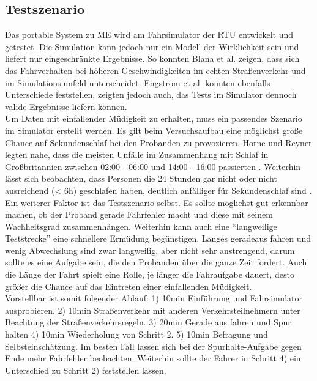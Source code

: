 {\subsection{Testszenario}
\label{sec:scene}
Das portable System zu \acl{ME} wird am Fahrsimulator der \acl{RTU} entwickelt und getestet.
Die Simulation kann jedoch nur ein Modell der Wirklichkeit sein und liefert nur eingeschränkte Ergebnisse. So konnten Blana et al. \cite{Blana_1} zeigen, dass sich das Fahrverhalten bei höheren Geschwindigkeiten im echten Straßenverkehr und im Simulationsumfeld unterscheidet. Engstrom et al.  \cite{Engstrom_2322937} konnten ebenfalls Unterschiede feststellen, zeigten jedoch auch, das Tests im Simulator dennoch valide Ergebnisse liefern können. \\

Um Daten mit einfallender Müdigkeit zu erhalten, muss ein passendes Szenario im Simulator erstellt werden. Es gilt beim Versuchsaufbau eine möglichst große Chance auf Sekundenschlaf bei den Probanden zu provozieren. Horne und Reyner legten nahe, dass die meisten Unfälle im Zusammenhang mit Schlaf in Großbritannien zwischen 02:00 - 06:00 und 14:00 - 16:00 passierten \cite{Horne_1757738}. Weiterhin lässt sich beobachten, dass Personen die 24 Stunden gar nicht oder nicht ausreichend (< 6h) geschlafen haben, deutlich anfälliger für Sekundenschlaf sind \cite{Peters_1}. 
Ein weiterer Faktor ist das Testszenario selbst. Es sollte möglichst gut erkennbar machen, ob der Proband gerade Fahrfehler macht und diese mit seinem Wachheitsgrad zusammenhängen. Weiterhin kann auch eine "`langweilige Teststrecke"' eine schnellere Ermüdung begünstigen. Langes geradeaus fahren und wenig Abwechslung sind zwar langweilig, aber nicht sehr anstrengend, darum sollte es eine Aufgabe sein, die den Probanden über die ganze Zeit fordert. Auch die Länge der Fahrt spielt eine Rolle, je länger die Fahraufgabe dauert, desto größer die Chance auf das Eintreten einer einfallenden Müdigkeit. \\

Vorstellbar ist somit folgender Ablauf: 1) 10min Einführung und Fahrsimulator ausprobieren. 2) 10min Straßenverkehr mit anderen Verkehrsteilnehmern unter Beachtung der Straßenverkehrsregeln. 3) 20min Gerade aus fahren und Spur halten 4) 10min Wiederholung von Schritt 2. 5) 10min Befragung und Selbsteinschätzung.
Im besten Fall lassen sich bei der Spurhalte-Aufgabe gegen Ende mehr Fahrfehler beobachten. Weiterhin sollte der Fahrer in Schritt 4) ein Unterschied zu Schritt 2) feststellen lassen.\\

}
